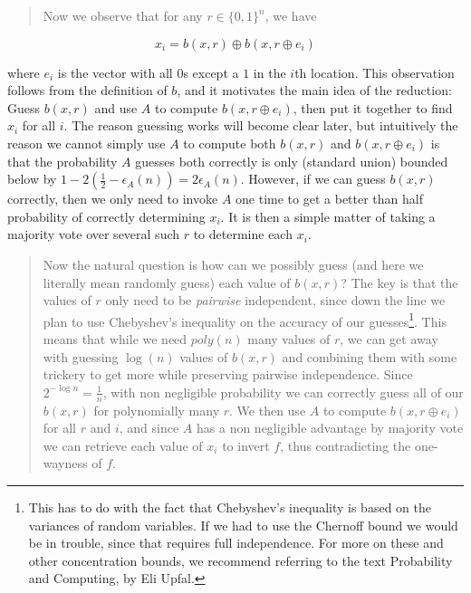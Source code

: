\begin{quote}
Now we observe that for any \(r \in \{0, 1\}^n\), we have
\end{quote}

\begin{equation*}
x_i = b(x, r) \oplus b(x, r \oplus e_i)
\end{equation*}

where \(e_i\) is the vector with all \(0\)s except a \(1\) in the
\(i\)th location. This observation follows from the definition of \(b\),
and it motivates the main idea of the reduction: Guess \(b(x, r)\) and
use \(A\) to compute \(b(x, r \oplus e_i)\), then put it together to
find \(x_i\) for all \(i\). The reason guessing works will become clear
later, but intuitively the reason we cannot simply use \(A\) to compute
both \(b(x, r)\) and \(b(x, r \oplus e_i)\) is that the probability
\(A\) guesses both correctly is only (standard union) bounded below by
\(1 - 2 \left( \tfrac{1}{2} - \epsilon_A(n)\right) = 2\epsilon_A(n)\).
However, if we can guess \(b(x, r)\) correctly, then we only need to
invoke \(A\) one time to get a better than half probability of correctly
determining \(x_i\). It is then a simple matter of taking a majority
vote over several such \(r\) to determine each \(x_i\).

\begin{quote}
Now the natural question is how can we possibly guess (and here we
literally mean randomly guess) each value of \(b(x, r)\)? The key is
that the values of \(r\) only need to be \emph{pairwise} independent,
since down the line we plan to use Chebyshev's inequality on the
accuracy of our guesses\footnote{This has to do with the fact that
  Chebyshev's inequality is based on the variances of random variables.
  If we had to use the Chernoff bound we would be in trouble, since that
  requires full independence. For more on these and other concentration
  bounds, we recommend referring to the text Probability and Computing,
  by Eli Upfal.}. This means that while we need \(poly(n)\) many values
of \(r\), we can get away with guessing \(\log (n)\) values of
\(b(x, r)\) and combining them with some trickery to get more while
preserving pairwise independence. Since \(2^{-\log n} = \tfrac{1}{n}\),
with non negligible probability we can correctly guess all of our
\(b(x, r)\) for polynomially many \(r\). We then use \(A\) to compute
\(b(x, r \oplus e_i)\) for all \(r\) and \(i\), and since \(A\) has a
non negligible advantage by majority vote we can retrieve each value of
\(x_i\) to invert \(f\), thus contradicting the one-wayness of \(f\).
\end{quote}

